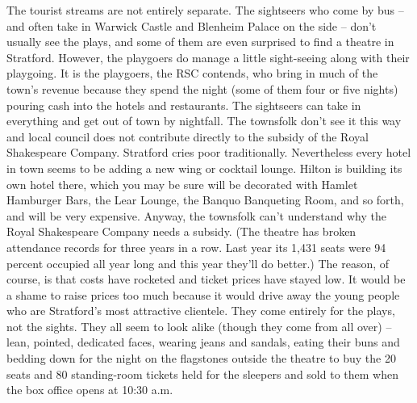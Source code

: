 The tourist streams are not entirely separate. The sightseers who come by bus -- and often take in Warwick Castle and Blenheim Palace on the side -- don’t usually see the plays, and some of them are even surprised to find a theatre in Stratford. However, the playgoers do manage a little sight-seeing along with their playgoing. It is the playgoers, the RSC contends, who bring in much of the town’s revenue because they spend the night (some of them four or five nights) pouring cash into the hotels and restaurants. The sightseers can take in everything and get out of town by nightfall.
The townsfolk don’t see it this way and local council does not contribute directly to the subsidy of the Royal Shakespeare Company. Stratford cries poor traditionally. Nevertheless every hotel in town seems to be adding a new wing or cocktail lounge. Hilton is building its own hotel there, which you may be sure will be decorated with Hamlet Hamburger Bars, the Lear Lounge, the Banquo Banqueting Room, and so forth, and will be very expensive.
Anyway, the townsfolk can’t understand why the Royal Shakespeare Company needs a subsidy. (The theatre has broken attendance records for three years in a row. Last year its 1,431 seats were 94 percent occupied all year long and this year they’ll do better.) The reason, of course, is that costs have rocketed and ticket prices have stayed low.
It would be a shame to raise prices too much because it would drive away the young people who are Stratford’s most attractive clientele. They come entirely for the plays, not the sights. They all seem to look alike (though they come from all over) -- lean, pointed, dedicated faces, wearing jeans and sandals, eating their buns and bedding down for the night on the flagstones outside the theatre to buy the 20 seats and 80 standing-room tickets held for the sleepers and sold to them when the box office opens at 10:30 a.m.
